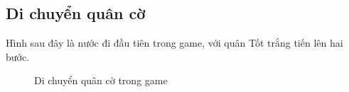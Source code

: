 \subsection{Di chuyển quân cờ}
Hình sau đây là nước đi đầu tiên trong game, với quân Tốt trắng tiến lên hai bước.
\begin{figure}[H]
\caption{Di chuyển quân cờ trong game}
\end{figure}

